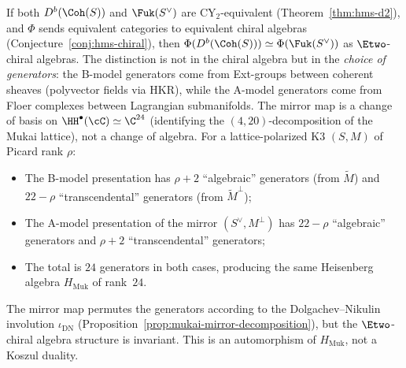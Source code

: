 \begin{remark}
\label{rem:ab-side-distinction}
If both $D^b(\Coh(S))$ and $\Fuk(S^\vee)$ are CY$_2$-equivalent (Theorem~\ref{thm:hms-d2}), and $\Phi$ sends equivalent categories to equivalent chiral algebras (Conjecture~\ref{conj:hms-chiral}), then $\Phi(D^b(\Coh(S))) \simeq \Phi(\Fuk(S^\vee))$ as $\Etwo$-chiral algebras. The distinction is not in the chiral algebra but in the \emph{choice of generators}: the B-model generators come from Ext-groups between coherent sheaves (polyvector fields via HKR), while the A-model generators come from Floer complexes between Lagrangian submanifolds. The mirror map is a change of basis on $\HH^\bullet(\cC) \simeq \C^{24}$ (identifying the $(4,20)$-decomposition of the Mukai lattice), not a change of algebra. For a lattice-polarized K3 $(S, M)$ of Picard rank $\rho$:
\begin{itemize}
 \item The B-model presentation has $\rho + 2$ ``algebraic'' generators (from $\widetilde{M}$) and $22 - \rho$ ``transcendental'' generators (from $\widetilde{M}^\perp$);
 \item The A-model presentation of the mirror $(S^\vee, M^\perp)$ has $22 - \rho$ ``algebraic'' generators and $\rho + 2$ ``transcendental'' generators;
 \item The total is $24$ generators in both cases, producing the same Heisenberg algebra $H_{\mathrm{Muk}}$ of rank~$24$.
\end{itemize}
The mirror map permutes the generators according to the Dolgachev--Nikulin involution $\iota_{\mathrm{DN}}$ (Proposition~\ref{prop:mukai-mirror-decomposition}), but the $\Etwo$-chiral algebra structure is invariant. This is an automorphism of $H_{\mathrm{Muk}}$, not a Koszul duality.
\end{remark}

